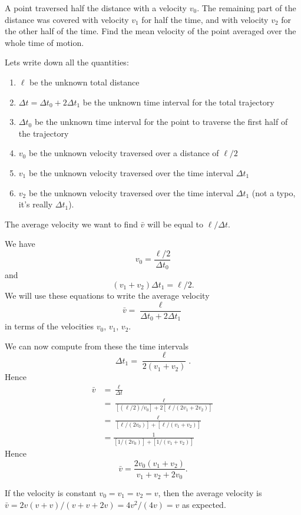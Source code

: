 \begin{xca}
A point traversed half the distance with a velocity $v_{0}$. The
remaining part of the distance was covered with velocity $v_{1}$ for
half the time, and with velocity $v_{2}$ for the other half of the
time. Find the mean velocity of the point averaged over the whole time
of motion.
\end{xca}

\begin{soln}
\IDENTIFY
Lets write down all the quantities:
\begin{enumerate}
\item $\ell$ be the unknown total distance
\item $\Delta t = \Delta t_{0} + 2\Delta t_{1}$ be the unknown time interval for the total trajectory
\item $\Delta t_{0}$ be the unknown time interval for the point to
traverse the first half of the trajectory
\item $v_{0}$ be the unknown velocity traversed over a distance of $\ell/2$
\item $v_{1}$ be the unknown velocity traversed over the time interval $\Delta t_{1}$
\item $v_{2}$ be the unknown velocity traversed over the time interval
$\Delta t_{1}$ (not a typo, it's really $\Delta t_{1}$).
\end{enumerate}
The average velocity we want to find $\bar{v}$ will be equal to $\ell/\Delta t$.

\SETUP
We have
\begin{equation}
   v_{0} = \frac{\ell/2}{\Delta t_{0}}
\end{equation}
and
\begin{equation}
    (v_{1} + v_{2})\Delta t_{1} = \ell/2.
\end{equation}
We will use these equations to write the average velocity
\begin{equation}
    \bar{v} = \frac{\ell}{\Delta t_{0} + 2\Delta t_{1}}
\end{equation}
in terms of the velocities $v_{0}$, $v_{1}$, $v_{2}$.

\EXECUTE
We can now compute from these the time intervals
\begin{equation}
\Delta t_{1} = \frac{\ell}{2(v_{1}+v_{2})}.
\end{equation}
Hence
\begin{subequations}
\begin{align}
\bar{v} &= \frac{\ell}{\Delta t}\\
&= \frac{\ell}{[(\ell/2)/v_{0}] + 2[\ell/(2v_{1}+2v_{2})]}\\
&= \frac{\ell}{[\ell/(2v_{0})] + [\ell/(v_{1}+v_{2})]}\\
&= \frac{1}{[1/(2v_{0})] + [1/(v_{1}+v_{2})]}
\end{align}
\end{subequations}
Hence
\begin{equation}
\bar{v} = \frac{2v_{0}(v_{1} + v_{2})}{v_{1} + v_{2} + 2v_{0}}.
\end{equation}

\EVALUATE
If the velocity is constant $v_{0}=v_{1}=v_{2}=v$,
then the average velocity is $\bar{v}=2v(v+v)/(v + v + 2v)=4v^{2}/(4v)=v$ as expected.
\end{soln}
